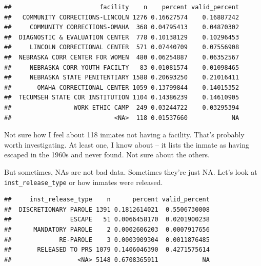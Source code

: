 \documentclass[]{book}
\newenvironment{Shaded}{\begin{snugshade}}{\end{snugshade}}
\newcommand{\KeywordTok}[1]{\textcolor[rgb]{0.13,0.29,0.53}{\textbf{#1}}}
\newcommand{\NormalTok}[1]{#1}
\newcommand{\OperatorTok}[1]{\textcolor[rgb]{0.81,0.36,0.00}{\textbf{#1}}}
\newcommand{\StringTok}[1]{\textcolor[rgb]{0.31,0.60,0.02}{#1}}
\begin{document}
\begin{Shaded}
\end{Shaded}

\begin{verbatim}
##                        facility    n    percent valid_percent
##   COMMUNITY CORRECTIONS-LINCOLN 1276 0.16627574    0.16887242
##     COMMUNITY CORRECTIONS-OMAHA  368 0.04795413    0.04870302
##  DIAGNOSTIC & EVALUATION CENTER  778 0.10138129    0.10296453
##     LINCOLN CORRECTIONAL CENTER  571 0.07440709    0.07556908
##  NEBRASKA CORR CENTER FOR WOMEN  480 0.06254887    0.06352567
##     NEBRASKA CORR YOUTH FACILTY   83 0.01081574    0.01098465
##     NEBRASKA STATE PENITENTIARY 1588 0.20693250    0.21016411
##       OMAHA CORRECTIONAL CENTER 1059 0.13799844    0.14015352
##  TECUMSEH STATE COR INSTITUTION 1104 0.14386239    0.14610905
##                 WORK ETHIC CAMP  249 0.03244722    0.03295394
##                            <NA>  118 0.01537660            NA
\end{verbatim}

Not sure how I feel about 118 inmates not having a facility. That's probably worth investigating. At least one, I know about -- it lists the inmate as having escaped in the 1960s and never found. Not sure about the others.

But sometimes, NAs are not bad data. Sometimes they're just NA. Let's look at \texttt{inst\_release\_type} or how inmates were released.

\begin{Shaded}
\end{Shaded}

\begin{verbatim}
##     inst_release_type    n      percent valid_percent
##  DISCRETIONARY PAROLE 1391 0.1812614021  0.5506730008
##                ESCAPE   51 0.0066458170  0.0201900238
##      MANDATORY PAROLE    2 0.0002606203  0.0007917656
##             RE-PAROLE    3 0.0003909304  0.0011876485
##       RELEASED TO PRS 1079 0.1406046390  0.4271575614
##                  <NA> 5148 0.6708365911            NA
\end{verbatim}
\end{document}
